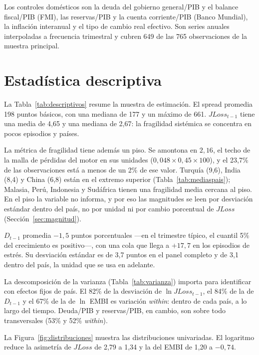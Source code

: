 Los controles domésticos son la deuda del gobierno general/PIB y el balance fiscal/PIB (FMI), las reservas/PIB y la cuenta corriente/PIB (Banco Mundial), la inflación interanual y el tipo de cambio real efectivo. Son series anuales interpoladas a frecuencia trimestral y cubren 649 de las 765 observaciones de la muestra principal.

\section{Estadística descriptiva}
\label{sec:descriptiva}

La Tabla~\ref{tab:descriptivos} resume la muestra de estimación. El spread promedia 198 puntos básicos, con una mediana de 177 y un máximo de 661. $JLoss_{t-1}$ tiene una media de 4,65 y una mediana de 2,67: la fragilidad sistémica se concentra en pocos episodios y países.



La métrica de fragilidad tiene además un piso. Se amontona en $2{,}16$, el techo de la malla de pérdidas del motor en sus unidades ($0{,}048\times0{,}45\times100$), y el 23,7\% de las observaciones está a menos de un 2\% de ese valor. Turquía (9,6), India (8,4) y China (6,8) están en el extremo superior (Tabla~\ref{tab:mediaspais}); Malasia, Perú, Indonesia y Sudáfrica tienen una fragilidad media cercana al piso. En el piso la variable no informa, y por eso las magnitudes se leen por desviación estándar dentro del país, no por unidad ni por cambio porcentual de $JLoss$ (Sección~\ref{sec:magnitud}).

$D_{t-1}$ promedia $-1{,}5$ puntos porcentuales ---en el trimestre típico, el cuantil 5\% del crecimiento es positivo---, con una cola que llega a $+17{,}7$ en los episodios de estrés. Su desviación estándar es de 3,7 puntos en el panel completo y de 3,1 dentro del país, la unidad que se usa en adelante.

La descomposición de la varianza (Tabla~\ref{tab:varianza}) importa para identificar con efectos fijos de país. El 82\% de la desviación de $\ln JLoss_{t-1}$, el 84\% de la de $D_{t-1}$ y el 67\% de la de $\ln$ EMBI es variación \textit{within}: dentro de cada país, a lo largo del tiempo. Deuda/PIB y reservas/PIB, en cambio, son sobre todo transversales (53\% y 52\% \textit{within}).

La Figura~\ref{fig:distribuciones} muestra las distribuciones univariadas. El logaritmo reduce la asimetría de $JLoss$ de 2,79 a 1,34 y la del EMBI de 1,20 a $-0{,}74$.

